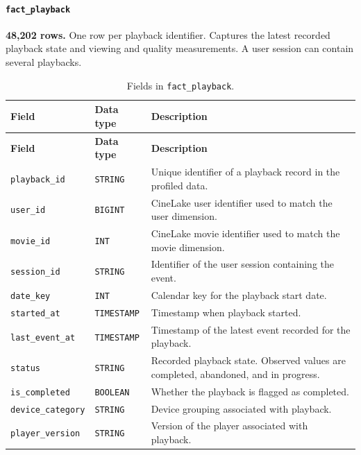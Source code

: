 \documentclass[a4paper,12pt]{article}
\newcommand{\dbsep}{\_\allowbreak}
\begin{document}
\paragraph{\texttt{fact\dbsep playback}}
\textbf{48,202 rows.} One row per playback identifier.
Captures the latest recorded playback state and viewing and quality measurements. A user session can contain several playbacks.

\begingroup
\small
\setlength{\tabcolsep}{4pt}
\renewcommand{\arraystretch}{1.1}
\begin{longtable}{@{}>{\raggedright\arraybackslash}p{}
                    >{\raggedright\arraybackslash}p{}
                    >{\raggedright\arraybackslash}p{}@{}}
\caption{Fields in \texttt{fact\dbsep playback}.}\\
\toprule
\textbf{Field} & \textbf{Data type} & \textbf{Description}\\
\midrule
\endfirsthead
\toprule
\textbf{Field} & \textbf{Data type} & \textbf{Description}\\
\midrule
\endhead
\bottomrule
\endfoot
\texttt{playback\dbsep id} & \texttt{STRING} & Unique identifier of a playback record in the profiled data.\\
\texttt{user\dbsep id} & \texttt{BIGINT} & CineLake user identifier used to match the user dimension.\\
\texttt{movie\dbsep id} & \texttt{INT} & CineLake movie identifier used to match the movie dimension.\\
\texttt{session\dbsep id} & \texttt{STRING} & Identifier of the user session containing the event.\\
\texttt{date\dbsep key} & \texttt{INT} & Calendar key for the playback start date.\\
\texttt{started\dbsep at} & \texttt{TIMESTAMP} & Timestamp when playback started.\\
\texttt{last\dbsep event\dbsep at} & \texttt{TIMESTAMP} & Timestamp of the latest event recorded for the playback.\\
\texttt{status} & \texttt{STRING} & Recorded playback state. Observed values are completed, abandoned, and in progress.\\
\texttt{is\dbsep completed} & \texttt{BOOLEAN} & Whether the playback is flagged as completed.\\
\texttt{device\dbsep category} & \texttt{STRING} & Device grouping associated with playback.\\
\texttt{player\dbsep version} & \texttt{STRING} & Version of the player associated with playback.\\

\end{longtable}
\end{document}
